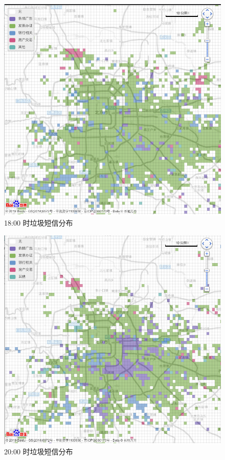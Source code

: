 \documentclass[12pt,a4paper]{article}
\begin{document}
\begin{itemize}
	\begin{flushleft}
		\begin{figure}[H]
			\centering
				\includegraphics[width=\linewidth]{2-18.png}
				\caption{18:00 时垃圾短信分布}
		\end{figure}
	\end{flushleft}

	\begin{flushleft}
		\begin{figure}[H]
			\centering
				\includegraphics[width=\linewidth]{2-20.png}
				\caption{20:00 时垃圾短信分布}
		\end{figure}
	\end{flushleft}


\end{itemize}
\end{document}
